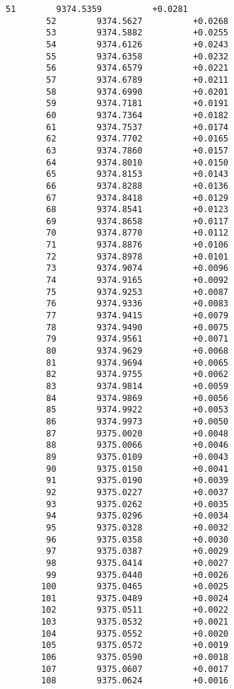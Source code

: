 \documentclass[11pt]{article}
\begin{document}
\begin{Verbatim}[commandchars=\\\{\}]
        51        9374.5359          +0.0281
        52        9374.5627          +0.0268
        53        9374.5882          +0.0255
        54        9374.6126          +0.0243
        55        9374.6358          +0.0232
        56        9374.6579          +0.0221
        57        9374.6789          +0.0211
        58        9374.6990          +0.0201
        59        9374.7181          +0.0191
        60        9374.7364          +0.0182
        61        9374.7537          +0.0174
        62        9374.7702          +0.0165
        63        9374.7860          +0.0157
        64        9374.8010          +0.0150
        65        9374.8153          +0.0143
        66        9374.8288          +0.0136
        67        9374.8418          +0.0129
        68        9374.8541          +0.0123
        69        9374.8658          +0.0117
        70        9374.8770          +0.0112
        71        9374.8876          +0.0106
        72        9374.8978          +0.0101
        73        9374.9074          +0.0096
        74        9374.9165          +0.0092
        75        9374.9253          +0.0087
        76        9374.9336          +0.0083
        77        9374.9415          +0.0079
        78        9374.9490          +0.0075
        79        9374.9561          +0.0071
        80        9374.9629          +0.0068
        81        9374.9694          +0.0065
        82        9374.9755          +0.0062
        83        9374.9814          +0.0059
        84        9374.9869          +0.0056
        85        9374.9922          +0.0053
        86        9374.9973          +0.0050
        87        9375.0020          +0.0048
        88        9375.0066          +0.0046
        89        9375.0109          +0.0043
        90        9375.0150          +0.0041
        91        9375.0190          +0.0039
        92        9375.0227          +0.0037
        93        9375.0262          +0.0035
        94        9375.0296          +0.0034
        95        9375.0328          +0.0032
        96        9375.0358          +0.0030
        97        9375.0387          +0.0029
        98        9375.0414          +0.0027
        99        9375.0440          +0.0026
       100        9375.0465          +0.0025
       101        9375.0489          +0.0024
       102        9375.0511          +0.0022
       103        9375.0532          +0.0021
       104        9375.0552          +0.0020
       105        9375.0572          +0.0019
       106        9375.0590          +0.0018
       107        9375.0607          +0.0017
       108        9375.0624          +0.0016

\end{Verbatim}
\end{document}

